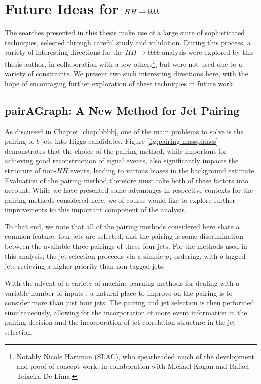 \chapter{Future Ideas for $HH\rightarrow b\bar{b}b\bar{b}$}
\label{chap:future}

The searches presented in this thesis make use of a large suite of sophisticated techniques, selected 
through careful study and validation. During this process, a variety of interesting 
directions for the $HH\rightarrow b\bar{b}b\bar{b}$ analysis were explored by this thesis author, 
in collaboration with a few others\footnote{Notably Nicole Hartman (SLAC), who spearheaded much of the 
development and proof of concept work, in collaboration with Michael Kagan and Rafael Teixeira De Lima.}, 
but were not used due to a variety of constraints. We present two such interesting directions here, 
with the hope of encouraging further exploration of these techniques in future work.

\section{pairAGraph: A New Method for Jet Pairing}
As discussed in Chapter \ref{chap:bbbb}, one of the main problems to solve is the pairing of 
$b$-jets into Higgs candidates. Figure \ref{fig:pairing-massplanes} demonstrates that the choice 
of the pairing method, while important for achieving good reconstruction of signal events, also 
significantly impacts the structure of non-$HH$ events, leading to various biases in the 
background estimate. Evaluation of the pairing method therefore must take both of these factors 
into account. While we have presented some advantages in respective contexts for the pairing 
methods considered here, we of course would like to explore further improvements to this important 
component of the analysis.

To that end, we note that all of the pairing methods considered here share a common feature: 
four jets are selected, and the pairing is some discrimination between the available three pairings 
of these four jets. For the methods used in this analysis, the jet selection proceeds via a 
simple $p_{T}$ ordering, with $b$-tagged jets recieving a higher priority than non-tagged jets.

With the advent of a variety of machine learning methods for dealing with a variable number of 
inputs , a natural place to improve on the 
pairing is to consider more than just four jets. The pairing and jet selection is then performed 
simultaneously, allowing for the incorporation of more event information in the pairing decision and 
the incorporation of jet correlation structure in the jet selection.

